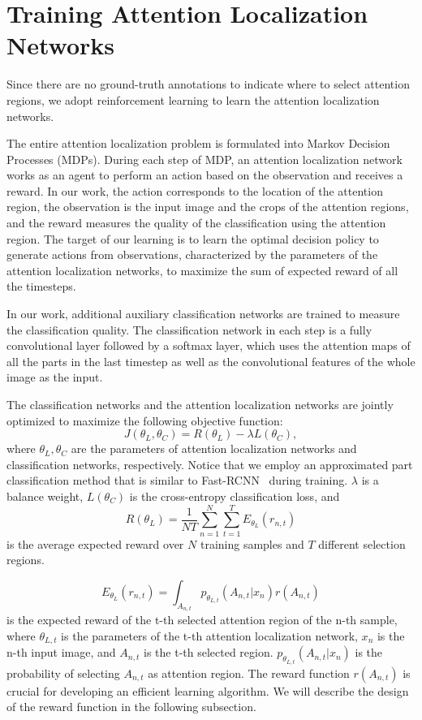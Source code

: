 \documentclass[runningheads]{llncs}
\begin{document}
\section{Training Attention Localization Networks}
Since there are no ground-truth annotations to indicate where to select attention regions, we adopt reinforcement learning to learn the attention localization networks.

The entire attention localization problem is formulated into Markov Decision Processes (MDPs).
During each step of MDP, an attention localization network works as an agent to perform an action based on the observation and receives a reward.
In our work, the action corresponds to the location of the attention region, the observation is the input image and the crops of the attention regions,
and the reward measures the quality of the classification using the attention region.
The target of our learning is to learn the optimal decision policy to generate actions from observations,
characterized by the parameters of the attention localization networks, to maximize the sum of expected reward of all the timesteps.

In our work, additional auxiliary classification networks are trained to measure the classification quality.
The classification network in each step is a fully convolutional layer followed by a softmax layer,
which uses the attention maps of all the parts in the last timestep as well as the convolutional features of the whole image as the input.


The classification networks and the attention localization networks are jointly optimized to maximize the following objective function:
\begin{equation}
J(\theta_L, \theta_C) =  R(\theta_L) - \lambda L(\theta_C),
\end{equation}
where $\theta_L, \theta_C$ are the parameters of attention localization networks and classification networks, respectively.
Notice that we employ an approximated part classification method that is similar to Fast-RCNN~\cite{girshick2015fast} during training.
$\lambda$ is a balance weight,  $L(\theta_C)$ is the cross-entropy classification loss, and
\begin{equation}
R(\theta_L) = \frac{1}{NT}\sum_{n=1}^{N}\sum_{t=1}^T E_{\theta_L}(r_{n,t})
\end{equation}
is the average expected reward over $N$ training samples and $T$ different selection regions.

\begin{equation}
E_{\theta_L}(r_{n,t}) = \int_{A_{n,t}} p_{\theta_{L,t}}(A_{n,t}|x_n)r(A_{n,t})
\end{equation}
is the expected reward of the t-th selected attention region of the n-th sample,
where $\theta_{L,t}$ is the parameters of the t-th attention localization network,
$x_n$ is the n-th input image, and $A_{n,t}$ is the t-th selected region.
$p_{\theta_{L,t}}(A_{n,t}|x_n)$ is the probability of selecting $A_{n,t}$ as attention region.
The reward function $r(A_{n,t})$ is crucial for developing an efficient learning algorithm. We will describe the design of the reward function in the following subsection.
\end{document}
